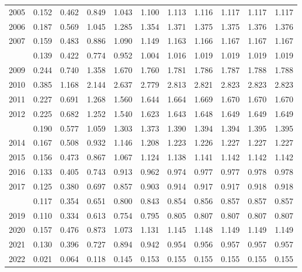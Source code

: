 \documentclass[
]{article}
\begin{document}
\begin{longtable}[t]{lrrrrrrrrrr}
2005 & 0.152 & 0.462 & 0.849 & 1.043 & 1.100 & 1.113 & 1.116 & 1.117 & 1.117 & 1.117\\
2006 & 0.187 & 0.569 & 1.045 & 1.285 & 1.354 & 1.371 & 1.375 & 1.375 & 1.376 & 1.376\\
2007 & 0.159 & 0.483 & 0.886 & 1.090 & 1.149 & 1.163 & 1.166 & 1.167 & 1.167 & 1.167\\
\addlinespace
2008 & 0.139 & 0.422 & 0.774 & 0.952 & 1.004 & 1.016 & 1.019 & 1.019 & 1.019 & 1.019\\
2009 & 0.244 & 0.740 & 1.358 & 1.670 & 1.760 & 1.781 & 1.786 & 1.787 & 1.788 & 1.788\\
2010 & 0.385 & 1.168 & 2.144 & 2.637 & 2.779 & 2.813 & 2.821 & 2.823 & 2.823 & 2.823\\
2011 & 0.227 & 0.691 & 1.268 & 1.560 & 1.644 & 1.664 & 1.669 & 1.670 & 1.670 & 1.670\\
2012 & 0.225 & 0.682 & 1.252 & 1.540 & 1.623 & 1.643 & 1.648 & 1.649 & 1.649 & 1.649\\
\addlinespace
2013 & 0.190 & 0.577 & 1.059 & 1.303 & 1.373 & 1.390 & 1.394 & 1.394 & 1.395 & 1.395\\
2014 & 0.167 & 0.508 & 0.932 & 1.146 & 1.208 & 1.223 & 1.226 & 1.227 & 1.227 & 1.227\\
2015 & 0.156 & 0.473 & 0.867 & 1.067 & 1.124 & 1.138 & 1.141 & 1.142 & 1.142 & 1.142\\
2016 & 0.133 & 0.405 & 0.743 & 0.913 & 0.962 & 0.974 & 0.977 & 0.977 & 0.978 & 0.978\\
2017 & 0.125 & 0.380 & 0.697 & 0.857 & 0.903 & 0.914 & 0.917 & 0.917 & 0.918 & 0.918\\
\addlinespace
2018 & 0.117 & 0.354 & 0.651 & 0.800 & 0.843 & 0.854 & 0.856 & 0.857 & 0.857 & 0.857\\
2019 & 0.110 & 0.334 & 0.613 & 0.754 & 0.795 & 0.805 & 0.807 & 0.807 & 0.807 & 0.807\\
2020 & 0.157 & 0.476 & 0.873 & 1.073 & 1.131 & 1.145 & 1.148 & 1.149 & 1.149 & 1.149\\
2021 & 0.130 & 0.396 & 0.727 & 0.894 & 0.942 & 0.954 & 0.956 & 0.957 & 0.957 & 0.957\\
2022 & 0.021 & 0.064 & 0.118 & 0.145 & 0.153 & 0.155 & 0.155 & 0.155 & 0.155 & 0.155\\*
\end{longtable}
\end{document}
